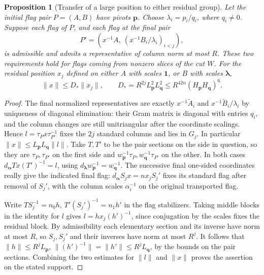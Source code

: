 \documentclass[a4paper,11pt]{article}
\newtheorem{proposition}{Proposition}[section]
\theoremstyle{definition}
\theoremstyle{remark}
\numberwithin{equation}{section}
\begin{document}
\begin{proposition}[Transfer of a large position to either residual group]
\leavevmode\label{prop:flagtransfer923}
Let the initial flag pair \(P=(A,B)\) have pivots \(\mathbf p\).
Choose \(\lambda_i=p_i/q_i\), where \(q_i\ne0\). Suppose each
flag of \(P\), and each flag at the final pair
\[
       P'=(x^{-1}A,\ (x^{-1}B_i/\lambda_i)_{i<j}),
\]
is admissible and admits a representative of column norm at
most \(R\). These two requirements hold for flags coming from
nonzero slices of the cut \(W\). For the
residual position \(x_j\) defined on either \(A\) with scales
\(\mathbf1\), or \(B\) with scales \(\boldsymbol\lambda\),
\[
      \|x\|\le D_*\|x_j\|,\qquad
 D_*=R^{2j}L_{\mathbf p}^2L_{\mathbf q}^2
       \le R^{42n}(H_{\mathbf p}H_{\mathbf q})^6 .
\]
\end{proposition}

\begin{proof}
The final normalized representatives are exactly
\(x^{-1}\widetilde A_i\) and \(x^{-1}\widetilde B_i/\lambda_i\)
by uniqueness of diagonal elimination: their Gram matrix is
diagonal with entries \(q_i\), and the column changes are still
unitriangular after the coordinate scalings. Hence
\(l=\tau_P x\tau_{P'}^{-1}\) fixes the \(2j\) standard columns
and lies in \(G_j\). In particular
\(\|x\|\le L_{\mathbf p}L_{\mathbf q}\|l\|\).
Take \(T,T'\) to be the pair sections on the side in question,
so they are \(\tau_P,\tau_{P'}\) on the first side and
\(w_{\mathbf p}^{-1}\tau_P,w_{\mathbf q}^{-1}\tau_{P'}\)
on the other. In both cases \(d_{\boldsymbol\alpha}T x(T')^{-1}=l\),
using \(d_{\boldsymbol\lambda}w_{\mathbf p}^{-1}=w_{\mathbf q}^{-1}\).
The successive final one-sided coordinates really give the
indicated final flag: \(d_{\boldsymbol\alpha}S_jx=n x_j S_j'\)
fixes its standard flag after removal of \(S_j'\), with the
column scales \(\alpha_i^{-1}\) on the original transported flag.

Write \(TS_j^{-1}=n_0 h\), \(T'(S_j')^{-1}=n_1 h'\) in the
flag stabilizers. Taking middle blocks in the identity for \(l\)
gives \(l=h x_j (h')^{-1}\), since conjugation by the scales
fixes the residual block. By admissibility each elementary section
and its inverse have norm at most \(R\), so \(S_j,S_j'\) and
their inverses have norm at most \(R^j\). It follows that
\(\|h\|\le R^j L_{\mathbf p}\), \(\|(h')^{-1}\|=\|h'\|\le
R^j L_{\mathbf q}\), by the bounds on the pair sections.
Combining the two estimates for \(\|l\|\) and \(\|x\|\) proves
the assertion on the stated support.
\end{proof}
\clearpage
\end{document}

